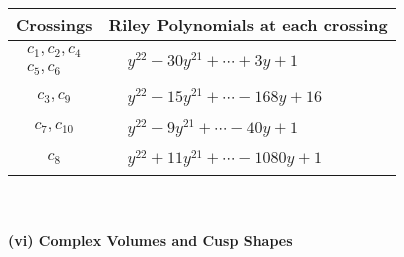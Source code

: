 \documentclass[1p]{elsarticle_modified}
\theoremstyle{definition}
\begin{document}
\begin{tabular}{m{50pt}|m{274pt}}
Crossings & \hspace{64pt}Riley Polynomials at each crossing \\
\hline $$\begin{aligned}c_{1},c_{2},c_{4}\\c_{5},c_{6}\end{aligned}$$&$\begin{aligned}
&y^{22}-30 y^{21}+\cdots+3 y+1
\end{aligned}$\\
\hline $$\begin{aligned}c_{3},c_{9}\end{aligned}$$&$\begin{aligned}
&y^{22}-15 y^{21}+\cdots-168 y+16
\end{aligned}$\\
\hline $$\begin{aligned}c_{7},c_{10}\end{aligned}$$&$\begin{aligned}
&y^{22}-9 y^{21}+\cdots-40 y+1
\end{aligned}$\\
\hline $$\begin{aligned}c_{8}\end{aligned}$$&$\begin{aligned}
&y^{22}+11 y^{21}+\cdots-1080 y+1
\end{aligned}$\\
\hline
\end{tabular}\\~\\
\newpage\flushleft \textbf{(vi) Complex Volumes and Cusp Shapes}
\end{document}

